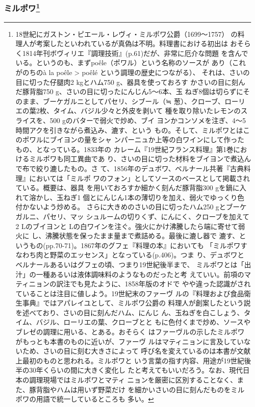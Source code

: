 \begin{recette}
{\subsubsection[ミルポワ]{\texorpdfstring{ミルポワ\footnote{18世紀にガストン・ピエール・レヴィ・ミルポワ公爵（1699〜1757）
  の料理人が考案したといわれているが真偽は不明。料理書における初出は
  おそらく1814年刊ボヴィリエ『調理技術』(p.61)だが、非常に厄介な問題
  を含んでいる。というのも、まずpoêle（ポワル）という名称のソースが
  あり（これがのちのà la poêle \textgreater{} poêlé
  という調理の歴史につながる）、 それは、さいの目に切った仔腿肉2
  kgとハム750 g、器具を使っておろす かさいの目に刻んだ豚背脂750
  g、さいの目に切ったにんじん5〜6本、玉
  ねぎ8個は切らずにそのまま、ブーケガルニとしてパセリ、シブール（≒
  葱）、クローブ、ローリエの葉2枚、タイム、バジル少々と外皮を剥いて
  種を取り除いたレモンのスライスを、500 gのバターで弱火で炒め、ブイ
  ヨンかコンソメを注ぎ、4〜5時間アクを引きながら煮込み、漉す、という
  もの。そして、ミルポワとはこのポワルにブイヨンの\unquart{}量をシャ
  ンパーニュか上等の白ワインにして作ったもの、となっている。1833年の
  カレーム『19世紀フランス料理』第1巻におけるミルポワも同工異曲であ
  り、さいの目に切った材料をブイヨンで煮込んで布で絞り漉したもの。さ
  て、1856年のデュボワ、ベルナール共著『古典料理』においては「ミルポ
  ワのフォン」としてソースのベースとして掲載されている。概要は、器具
  を用いておろすか細かく刻んだ豚背脂300 gを鍋に入れて溶かし、玉ねぎ1
  個とにんじん1本の薄切りを加え、弱火でゆっくり色付かないよう炒める。
  さらに大きめのさいの目に切ったハム250 gとブーケガルニ、パセリ、マッ
  シュルームの切りくず、にんにく、クローブを加えて2 Lのブイヨンと
  \undemi{} Lの白ワインを注ぐ。強火にかけ沸騰したら端に寄せて弱火に
  し、沸騰状態を保ったまま\deuxtiers{}量まで煮詰める。最後に漉し器で
  漉す、というもの(pp.70-71)。1867年のグフェ『料理の本』においても
  「ミルポワすなわち肉と野菜のエッセンス」となっている(p.406)。つま
  り、デュボワとベルナールあるいはグフェの頃、つまり19世紀後半まで、
  ミルポワとは「出汁」の一種あるいは液体調味料のようなものだったと考
  えていい。前項のマティニョンの訳注でも見たように、1858年版のオドで
  やや違った認識がされていることは注目に値しよう。19世紀末のファーヴ
  ルの『料理および食品衛生事典』ではアパレイユとして、ミルポワ公爵の
  料理人が創案したという説を述べており、さいの目に刻んだハム、にんじ
  ん、玉ねぎを白こしょう、タイム、バジル、ローリエの葉、クローブとと
  もに色付くまで炒め、ソースやブレゼの調理に用いる、とある。おそらく
  はファーヴルの示したミルポワがもっとも本書のものに近いが、ファーヴ
  ルはマティニョンに言及していないため、さいの目に刻む大きさによって
  呼び名を変えているのは本書が文献上最初のものと思われる。ミルポワと
  いう言葉の指す内容、用途が19世紀後半の30年くらいの間に大きく変化し
  たと考えてもいいだろう。なお、現代日本の調理現場ではミルポワとマティ
  ニョンを厳密に区別することなく、また、豚背脂やハムは用いず野菜だけ
  を細かいさいの目に刻んだものをミルポワの用語で統一しているところも
  多い。}}{ミルポワ}}\label{mirepoix}}


\end{recette}
